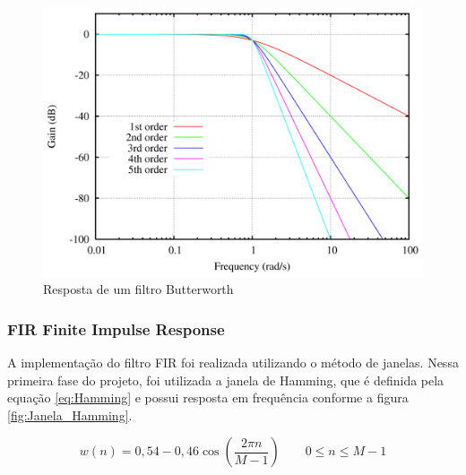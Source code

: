 \begin{figure}[h!]
	\begin{center}
		\includegraphics[width=0.5\linewidth]{images/Butterworth_orders.png}
		\caption{Resposta de um filtro Butterworth}
		\label{fig:Ordem_Filtro_Butterworth}
	\end{center}
\end{figure}

\subsubsection{FIR Finite Impulse Response}

A implementação do filtro FIR foi realizada utilizando o método de janelas. Nessa primeira fase do projeto, foi utilizada a janela de Hamming, que é definida pela equação \ref{eq:Hamming} e possui resposta em frequência conforme a figura \ref{fig:Janela_Hamming}.
 
 
\begin{equation} \label{eq:Hamming}
w(n) = 0,54 - 0,46\cos \left(\dfrac{2\pi n}{M - 1}\right) \qquad 0 \le n \le M-1
\end{equation} 

